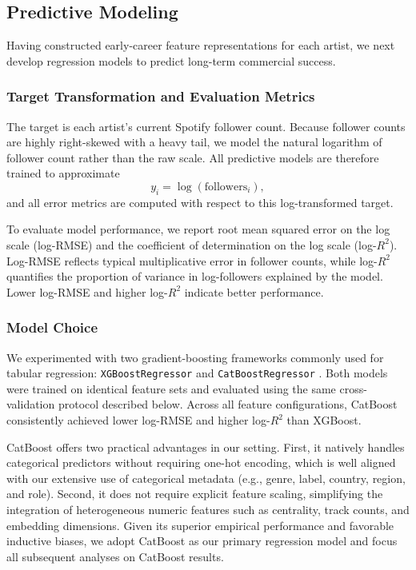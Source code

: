 \documentclass[fleqn,10pt]{wlscirep}
\begin{document}
\subsection*{Predictive Modeling}
Having constructed early-career feature representations for each artist, we next develop regression models to predict long-term commercial success. 

\subsubsection*{Target Transformation and Evaluation Metrics}

The target is each artist's current Spotify follower count. Because follower counts are highly right-skewed with a heavy tail, we model the natural logarithm of follower count rather than the raw scale. All predictive models are therefore trained to approximate
\[
    y_i = \log(\text{followers}_i),
\]
and all error metrics are computed with respect to this log-transformed target.

To evaluate model performance, we report root mean squared error on the log scale (log-RMSE) and the coefficient of determination on the log scale (log-$R^2$). Log-RMSE reflects typical multiplicative error in follower counts, while log-$R^2$ quantifies the proportion of variance in log-followers explained by the model. Lower log-RMSE and higher log-$R^2$ indicate better performance.

\subsubsection*{Model Choice}

We experimented with two gradient-boosting frameworks commonly used for tabular regression: \texttt{XGBoostRegressor} and \texttt{CatBoostRegressor} \cite{Chen2016XGBoost, prokhorenkova2018catboost}. Both models were trained on identical feature sets and evaluated using the same cross-validation protocol described below. Across all feature configurations, CatBoost consistently achieved lower log-RMSE and higher log-$R^2$ than XGBoost. 

CatBoost offers two practical advantages in our setting. First, it natively handles categorical predictors without requiring one-hot encoding, which is well aligned with our extensive use of categorical metadata (e.g., genre, label, country, region, and role). Second, it does not require explicit feature scaling, simplifying the integration of heterogeneous numeric features such as centrality, track counts, and embedding dimensions. Given its superior empirical performance and favorable inductive biases, we adopt CatBoost as our primary regression model and focus all subsequent analyses on CatBoost results.
\end{document}
